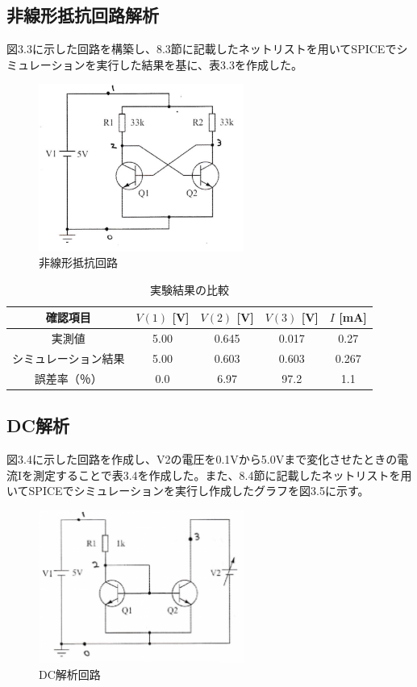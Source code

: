 \documentclass{jlreq}
\numberwithin{equation}{section}
\begin{document}
\subsection{非線形抵抗回路解析}
図3.3に示した回路を構築し、8.3節に記載したネットリストを用いてSPICEでシミュレーションを実行した結果を基に、表3.3を作成した。

\begin{figure}[H]
  \centering
  \includegraphics[width=0.6\textwidth]{assets/hisenkeikairo.png}
  \caption{非線形抵抗回路}
\end{figure}

\begin{table}[H]
  \centering
  \caption{実験結果の比較}
  \begin{tabular}{|c|c|c|c|c|}
    \hline
    確認項目 & \( V(1) \) [V] & \( V(2) \) [V] & \( V(3) \) [V] & \( I \) [mA] \\ \hline
    実測値 & 5.00 & 0.645 & 0.017 & 0.27 \\ \hline
    シミュレーション結果 & 5.00 & 0.603 & 0.603 & 0.267\\ \hline
    誤差率（％） & 0.0 & 6.97 & 97.2 & 1.1 \\ \hline
  \end{tabular}
\end{table}

\subsection{DC解析}
図3.4に示した回路を作成し、V2の電圧を0.1Vから5.0Vまで変化させたときの電流Iを測定することで表3.4を作成した。また、8.4節に記載したネットリストを用いてSPICEでシミュレーションを実行し作成したグラフを図3.5に示す。

\begin{figure}[H]
  \centering
  \includegraphics[width=0.6\textwidth]{assets/dckairo.png}
  \caption{DC解析回路}
\end{figure}
\end{document}
